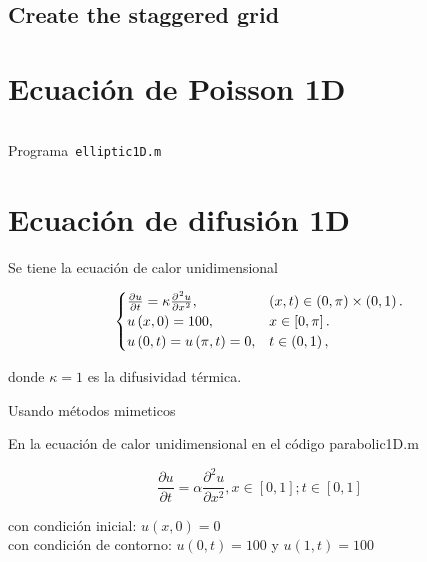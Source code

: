 \documentclass[a4paper,abstract=true]{scrreprt}
\begin{document}
\subsection{Create the staggered grid}

\section{Ecuación de Poisson 1D}

\begin{listing}[ht!]
    \tiny
    \centering
    \inputminted[frame=single,framesep=10pt,linenos,firstline=1,lastline=53,highlightlines={21,29}]{octave}{../examples/octave/elliptic1D.m}
    \caption{Programa~\texttt{elliptic1D.m}}
    \label{code:elliptic1D.m}
\end{listing}

\section{Ecuación de difusión 1D}
Se tiene la ecuación de calor unidimensional

\begin{equation}\label{eq:IBVPheat1d}
    \begin{cases}
        \diffp{u}{t}=
        \kappa\diffp[2]{u}{x},
         & \left(x,t\right)\in
        \left(0,\pi\right)\times\left(0,1\right). \\
        u\left(x,0\right)=
        100,
         & x\in
        \left[0,\pi\right].                       \\
        u\left(0,t\right)=
        u\left(\pi,t\right)=0,
         & t\in
        \left(0,1\right),
    \end{cases}
\end{equation}

donde $\kappa=1$ es la difusividad térmica.

Usando métodos mimeticos

En  la ecuación de calor unidimensional en el código parabolic1D.m

\begin{equation}
    \frac{\partial u}{\partial t} = \alpha \frac{\partial^{2} u}{\partial x^{2}},   x \in [0,1] ; t \in [0,1]
\end{equation}

con condición inicial: $u(x,0) = 0$\\

con condición de contorno: $u(0,t)= 100$ y $u(1,t) =100$\\
\end{document}
